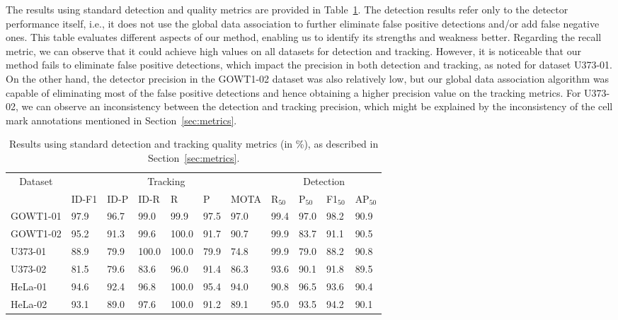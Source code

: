 \documentclass{article}
\begin{document}
The results using standard detection and quality metrics are provided in Table~\ref{tab:STD_results}. The detection results refer only to the detector performance itself, i.e., it does not use the global data association to further eliminate false positive detections and/or add false negative ones. This table evaluates different aspects of our method, enabling us to identify its strengths and weakness better. Regarding the recall metric, we can observe that it could achieve high values on all datasets for detection and tracking. However, it is noticeable that our method fails to eliminate false positive detections, which impact the precision in both detection and tracking, as noted for dataset U373-01. On the other hand, the detector precision in the GOWT1-02 dataset was also relatively low, but our global data association algorithm was capable of eliminating most of the false positive detections and hence obtaining a higher precision value on the tracking metrics. For U373-02, we can observe an inconsistency between the detection and tracking precision, which might be explained by the inconsistency of the cell mark annotations mentioned in Section~\ref{sec:metrics}.

\begin{table}[]
\caption[Results using standard detection and tracking quality metrics.]{Results using standard detection and tracking quality metrics (in \%), as described in Section~\ref{sec:metrics}.}
\centering
\begin{tabular}{l|llllll|llll}
\multicolumn{1}{c|}{\multirow{2}{*}{Dataset}} & \multicolumn{6}{c|}{Tracking} & \multicolumn{4}{c}{Detection} \\ \cline{2-11} 
\multicolumn{1}{c|}{} & ID-F1 & ID-P & ID-R & R & P & MOTA & R$_{50}$ & P$_{50}$ & F1$_{50}$ & AP$_{50}$ \\ \hline
GOWT1-01 & 97.9 & 96.7 & 99.0 & 99.9 & 97.5 & 97.0 & 99.4 & 97.0 & 98.2 & 90.9 \\
GOWT1-02 & 95.2 & 91.3 & 99.6 & 100.0 & 91.7 & 90.7 & 99.9 & 83.7 & 91.1 & 90.5 \\
U373-01 & 88.9 & 79.9 & 100.0 & 100.0 & 79.9 & 74.8 & 99.9 & 79.0 & 88.2 & 90.8 \\
U373-02 & 81.5 & 79.6 & 83.6 & 96.0 & 91.4 & 86.3 & 93.6 & 90.1 & 91.8 & 89.5 \\
HeLa-01 & 94.6 & 92.4 & 96.8 & 100.0 & 95.4 & 94.0 & 90.8 & 96.5 & 93.6 & 90.4 \\
HeLa-02 & 93.1 & 89.0 & 97.6 & 100.0 & 91.2 & 89.1 & 95.0 & 93.5 & 94.2 & 90.1
\end{tabular}
\label{tab:STD_results}
\end{table}
\end{document}
